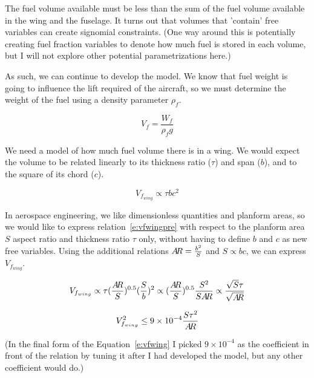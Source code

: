 The fuel volume available must be less than the sum of the fuel volume available in the
wing and the fuselage. It turns out that volumes that 'contain' free variables
can create signomial constraints. (One way around this is potentially creating fuel
fraction variables to denote how much fuel is stored in each volume, but I will not 
explore other potential parametrizations here.)

As such, we can continue to develop the model. We know that fuel weight is going
to influence the lift required of the aircraft, so we must determine the weight of the fuel 
using a density parameter $\rho_{f}$. 

\begin{equation}
    V_f = \frac{W_f } {\rho_f g}
    \label{e:vf}
\end{equation}

We need a model of how much fuel volume there is in a wing. We would expect the volume
to be related linearly to its thickness ratio ($\tau$) and span ($b$),
and to the square of its chord ($c$). 

\begin{equation}
	V_{f_{wing}} \propto \tau b c^2
	\label{e:vfwingpre}
\end{equation} 

In aerospace engineering, we like dimensionless quantities and planform areas, 
so we would like to express relation~\ref{e:vfwingpre} with respect to the planform area $S$
aspect ratio \AR and thickness ratio $\tau$ only, without having to define $b$ and $c$ as new
free variables.
Using the additional relations $A\hspace{-2.0pt}R = \frac{b^2}{S}$ and $S \propto b c$, we can express $V_{f_{wing}}$.

\begin{equation}
	V_{f_{wing}} \propto \tau (\frac{A\hspace{-2.0pt}R}{S})^{0.5} (\frac{S}{b})^2 \propto
		(\frac{A\hspace{-2.0pt}R}{S})^{0.5} \frac{S^2}{S A\hspace{-2.0pt}R} \propto \frac{\sqrt{S}\tau}{\sqrt{A\hspace{-2.0pt}R}}
\end{equation}

\begin{equation}
\label{e:vfwing}
V_{f_{wing}}^2 \leq 9\times10^{-4} \frac{S \tau^2}{A\hspace{-2.0pt}R}
\end{equation}

(In the final form of the Equation~\ref{e:vfwing} I picked $9\times10^{-4}$ as the coefficient in
front of the relation by tuning it after I had developed
the model, but any other coefficient would do.)

